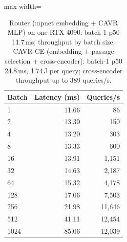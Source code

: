 \begin{table}[t]
\centering
\caption{Router (mpnet embedding + CAVR MLP) on one RTX 4090: batch-1 p50 11.7\,ms; throughput by batch size. CAVR-CE (embedding + passage selection + cross-encoder): batch-1 p50 24.8\,ms, 1.74\,J per query; cross-encoder throughput up to 389 queries/s.}
\label{tab:router_throughput}
\begin{adjustbox}{max width=\linewidth}
\begin{tabular}{lrr}
\toprule
\textbf{Batch} & \textbf{Latency (ms)} & \textbf{Queries/s} \\
\midrule
1 & 11.66 & 86 \\
2 & 13.30 & 150 \\
4 & 13.20 & 303 \\
8 & 13.33 & 600 \\
16 & 13.91 & 1,151 \\
32 & 14.63 & 2,187 \\
64 & 15.32 & 4,178 \\
128 & 17.06 & 7,503 \\
256 & 21.98 & 11,646 \\
512 & 41.11 & 12,454 \\
1024 & 85.06 & 12,039 \\
\bottomrule
\end{tabular}
\end{adjustbox}
\end{table}
